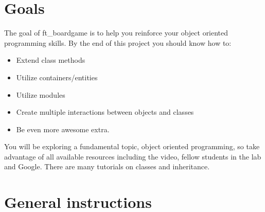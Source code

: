 \documentclass{42-en}
\begin{document}
\chapter{Goals}

	The goal of ft\_boardgame is to help you reinforce your object oriented programming skills.
	By the end of this project you should know how to:\\
	
	\begin{itemize}
		\item Extend class methods
		\item Utilize containers/entities
		\item Utilize modules
		\item Create multiple interactions between objects and classes
		\item Be even more awesome extra.\\
	\end{itemize}
	 
	You will be exploring a fundamental topic, object oriented programming,
	so take advantage of all available resources including the video, fellow
	students in the lab and Google. There are many tutorials on classes and inheritance.


\chapter{General instructions}
\end{document}
